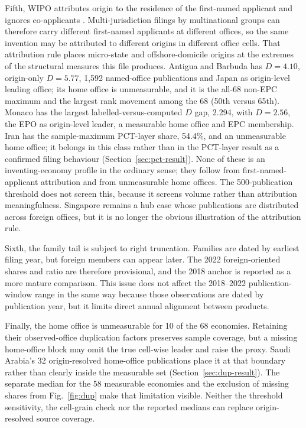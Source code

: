 \documentclass[a4paper,fleqn]{cas-dc}
\begin{document}
Fifth, WIPO attributes origin to the residence of the first-named applicant
and ignores co-applicants \citep{wipoabout}. Multi-jurisdiction filings by
multinational groups can therefore carry different first-named applicants at
different offices, so the same invention may be attributed to different
origins in different office cells. That attribution rule places
micro-state and offshore-domicile origins at the extremes of the structural
measures this file produces. Antigua and Barbuda has $D=4.10$, origin-only
$D=5.77$, 1,592 named-office publications and Japan as origin-level leading
office; its home office is unmeasurable, and it is the all-68 non-EPC
maximum and the largest rank movement among the 68 (50th versus 65th).
Monaco has the largest labelled-versus-computed $D$ gap, 2.294, with $D=2.56$,
the EPO as origin-level leader, a measurable home office and EPC membership.
Iran has the sample-maximum PCT-layer share, 54.4\%, and an unmeasurable home
office; it belongs in this class rather than in the PCT-layer result as a
confirmed filing behaviour (Section~\ref{sec:pct-result}).
None of these is an inventing-economy profile in the ordinary sense; they
follow from first-named-applicant attribution and from unmeasurable home
offices. The 500-publication threshold
does not screen this, because it screens volume rather than attribution
meaningfulness. Singapore remains a hub case whose publications are
distributed across foreign offices, but it is no longer the obvious
illustration of the attribution rule.

Sixth, the family tail is subject to right truncation. Families are dated by
earliest filing year, but foreign members can appear later. The 2022
foreign-oriented shares and ratio are therefore provisional, and the 2018
anchor is reported as a more mature comparison. This issue does not affect
the 2018--2022 publication-window range in the same way because those
observations are dated by publication year, but it limits direct annual
alignment between products.

Finally, the home office is unmeasurable for 10 of the 68 economies. Retaining
their observed-office duplication factors preserves sample coverage, but a
missing home-office block may omit the true cell-wise leader and raise the
proxy. Saudi Arabia's 32 origin-resolved home-office publications place it at
that boundary rather than clearly inside the measurable set
(Section~\ref{sec:dup-result}). The separate median for the 58 measurable
economies and the exclusion of missing shares from Fig.~\ref{fig:dup} make
that limitation visible. Neither the threshold sensitivity, the cell-grain
check nor the reported medians can replace origin-resolved source coverage.
\end{document}
